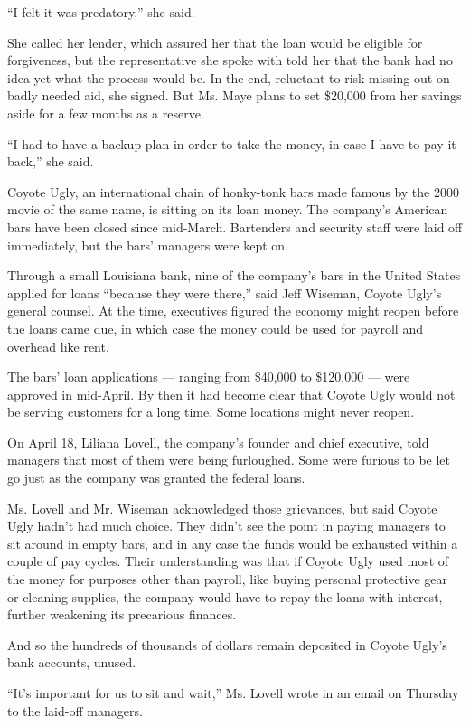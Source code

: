 ``I felt it was predatory,'' she said.

She called her lender, which assured her that the loan would be eligible
for forgiveness, but the representative she spoke with told her that the
bank had no idea yet what the process would be. In the end, reluctant to
risk missing out on badly needed aid, she signed. But Ms. Maye plans to
set \$20,000 from her savings aside for a few months as a reserve.

``I had to have a backup plan in order to take the money, in case I have
to pay it back,'' she said.

Coyote Ugly, an international chain of honky-tonk bars made famous by
the 2000 movie of the same name, is sitting on its loan money. The
company's American bars have been closed since mid-March. Bartenders and
security staff were laid off immediately, but the bars' managers were
kept on.

Through a small Louisiana bank, nine of the company's bars in the United
States applied for loans ``because they were there,'' said Jeff Wiseman,
Coyote Ugly's general counsel. At the time, executives figured the
economy might reopen before the loans came due, in which case the money
could be used for payroll and overhead like rent.

The bars' loan applications --- ranging from \$40,000 to \$120,000 ---
were approved in mid-April. By then it had become clear that Coyote Ugly
would not be serving customers for a long time. Some locations might
never reopen.

On April 18, Liliana Lovell, the company's founder and chief executive,
told managers that most of them were being furloughed. Some were furious
to be let go just as the company was granted the federal loans.

Ms. Lovell and Mr. Wiseman acknowledged those grievances, but said
Coyote Ugly hadn't had much choice. They didn't see the point in paying
managers to sit around in empty bars, and in any case the funds would be
exhausted within a couple of pay cycles. Their understanding was that if
Coyote Ugly used most of the money for purposes other than payroll, like
buying personal protective gear or cleaning supplies, the company would
have to repay the loans with interest, further weakening its precarious
finances.

And so the hundreds of thousands of dollars remain deposited in Coyote
Ugly's bank accounts, unused.

``It's important for us to sit and wait,'' Ms. Lovell wrote in an email
on Thursday to the laid-off managers.

